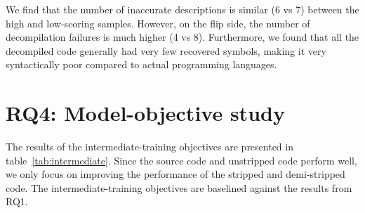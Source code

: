 We find that the number of inaccurate descriptions is similar (6 vs 7) between the high and low-scoring samples. However, on the flip side, the number of decompilation failures is much higher (4 vs 8).
Furthermore, we found that all the decompiled code generally had very few recovered symbols, making it very syntactically poor compared to actual programming languages.


\section{RQ4: Model-objective study}
The results of the intermediate-training objectives are presented in table~\ref{tab:intermediate}. Since the source code and unstripped code perform well, we only focus on improving the performance of the stripped and demi-stripped code. The intermediate-training objectives are baselined against the results from RQ1.

